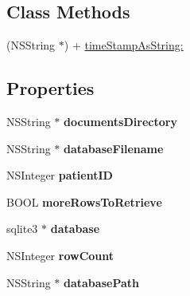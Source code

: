 \subsection*{Class Methods}
\begin{DoxyCompactItemize}
\item 
(N\-S\-String $\ast$) + \hyperlink{interface_d_b_manager_a7c8d65202b11dbd5c926bc6a01c4259d}{time\-Stamp\-As\-String\-:}
\end{DoxyCompactItemize}
\subsection*{Properties}
\begin{DoxyCompactItemize}
\item 
\hypertarget{interface_d_b_manager_a2da5077535faad528421bada70121866}{N\-S\-String $\ast$ {\bfseries documents\-Directory}}\label{interface_d_b_manager_a2da5077535faad528421bada70121866}

\item 
\hypertarget{interface_d_b_manager_a725c101d5daf6506b59e0f7e06993982}{N\-S\-String $\ast$ {\bfseries database\-Filename}}\label{interface_d_b_manager_a725c101d5daf6506b59e0f7e06993982}

\item 
\hypertarget{interface_d_b_manager_a7206acae059164df418a2dbfaa7fbb13}{N\-S\-Integer {\bfseries patient\-I\-D}}\label{interface_d_b_manager_a7206acae059164df418a2dbfaa7fbb13}

\item 
\hypertarget{interface_d_b_manager_a921cb5034e1b4f79c6db59a1ce3fd579}{B\-O\-O\-L {\bfseries more\-Rows\-To\-Retrieve}}\label{interface_d_b_manager_a921cb5034e1b4f79c6db59a1ce3fd579}

\item 
\hypertarget{interface_d_b_manager_aa3315763d817eb3c10dac39ee530e2a8}{sqlite3 $\ast$ {\bfseries database}}\label{interface_d_b_manager_aa3315763d817eb3c10dac39ee530e2a8}

\item 
\hypertarget{interface_d_b_manager_a7299e28bee3f75281496adcebb46010b}{N\-S\-Integer {\bfseries row\-Count}}\label{interface_d_b_manager_a7299e28bee3f75281496adcebb46010b}

\item 
\hypertarget{interface_d_b_manager_a15a4e85cdc292d83ee3d8b28e43c43bc}{N\-S\-String $\ast$ {\bfseries database\-Path}}\label{interface_d_b_manager_a15a4e85cdc292d83ee3d8b28e43c43bc}


\end{DoxyCompactItemize}
